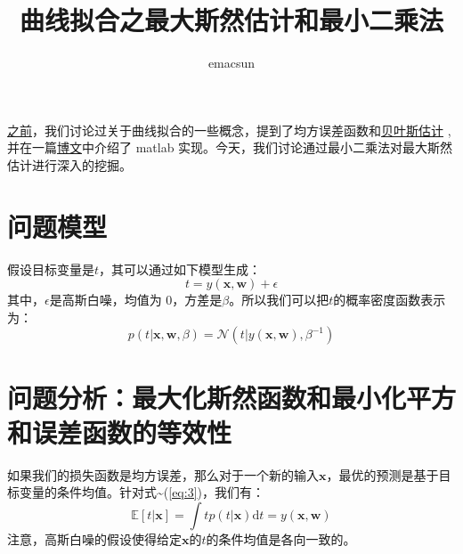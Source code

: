 \documentclass[10pt,a4paper,UTF8]{article}
\author{emacsun}
\date{}
\title{曲线拟合之最大斯然估计和最小二乘法}
\begin{document}
\maketitle
\tableofcontents
{}
\href{PRMLch1dot1-polynomial-curve.org}{之前}，我们讨论过关于曲线拟合的一些概念，提到了均方误差函数和\href{PRMLch1dot1-polynomial-curve-probability-revist.org}{贝叶斯估计} , 并在一篇\href{PRMLch1dot1-polynomial-curve-matlab.org}{博文}中介绍了 matlab 实现。今天，我们讨论通过最小二乘法对最大斯然估计进行深入的挖掘。

\section{问题模型}
\label{sec:org4f0753a}


假设目标变量是\(t\)，其可以通过如下模型生成：
\begin{equation}
\label{eq:1}
t = y(\mathbf{x},\mathbf{w}) + \epsilon
\end{equation}
其中，\(\epsilon\)是高斯白噪，均值为 0，方差是\(\beta\)。所以我们可以把\(t\)的概率密度函数表示为：
\begin{equation}
\label{eq:3}
p(t|\mathbf{x},\mathbf{w},\beta) = \mathcal{N}(t|y(\mathbf{x},\mathbf{w}),\beta^{-1})
\end{equation}
\section{问题分析：最大化斯然函数和最小化平方和误差函数的等效性}
\label{sec:orgd45cc90}


如果我们的损失函数是均方误差，那么对于一个新的输入\(\mathbf{x}\)，最优的预测是基于目标变量的条件均值。针对式\textasciitilde{}(\ref{eq:3})，我们有：
\begin{equation}
\label{eq:4}
\mathbb{E}[t|\mathbf{x}] = \int tp(t|\mathbf{x})\mathrm{d}t = y(\mathbf{x},\mathbf{w})
\end{equation}
注意，高斯白噪的假设使得给定\(\mathbf{x}\)的\(t\)的条件均值是各向一致的。
\end{document}
